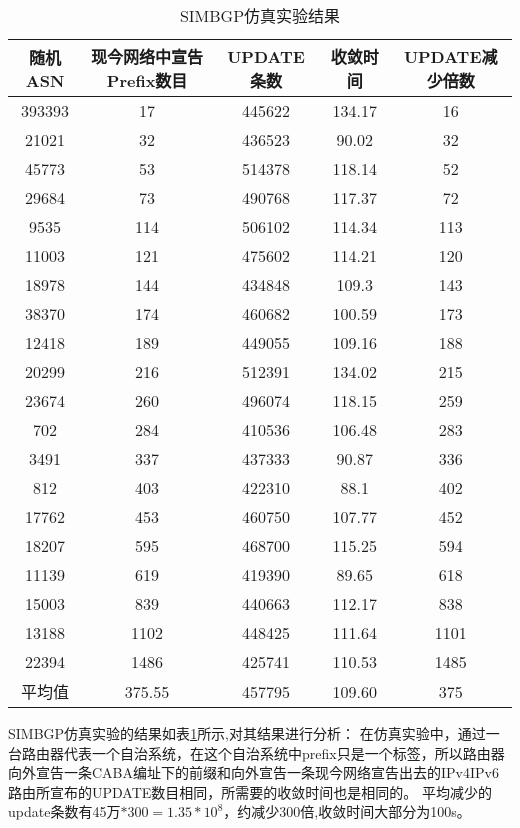 \begin{table}[h]
  \centering
  \caption{SIMBGP仿真实验结果}
  \label{tab:simres}
  \begin{tabular}{|c|c|c|c|c|}
            \hline
            随机ASN & 现今网络中宣告Prefix数目 & UPDATE条数 & 收敛时间 & UPDATE减少倍数\\ \hline
            393393 & 17 & 445622 & 134.17 & 16 \\ \hline
            21021 & 32 & 436523 & 90.02 & 32 \\ \hline
            45773 & 53 & 514378 & 118.14 & 52 \\ \hline
            29684 & 73 & 490768 & 117.37 & 72 \\ \hline
            9535 & 114 & 506102 & 114.34 & 113 \\ \hline
            11003 & 121 & 475602 & 114.21 & 120 \\ \hline
            18978 & 144 & 434848 & 109.3 & 143 \\ \hline
            38370 & 174 & 460682 & 100.59 & 173 \\ \hline
            12418 & 189 & 449055 & 109.16 & 188 \\ \hline
            20299 & 216 & 512391 & 134.02 & 215 \\ \hline
            23674 & 260 & 496074 & 118.15 & 259 \\ \hline
            702 & 284 & 410536 & 106.48 & 283 \\ \hline
            3491 & 337 & 437333 & 90.87 & 336 \\ \hline
            812 & 403 & 422310 & 88.1 & 402 \\ \hline
            17762 & 453 & 460750 & 107.77 & 452 \\ \hline
            18207 & 595 & 468700 & 115.25 & 594 \\ \hline
            11139 & 619 & 419390 & 89.65 & 618 \\ \hline
            15003 & 839 & 440663 & 112.17 & 838 \\ \hline
            13188 & 1102 & 448425 & 111.64 & 1101 \\ \hline
            22394 & 1486 & 425741 & 110.53 & 1485 \\ \hline
            平均值 & 375.55 & 457795 & 109.60 & 375 \\ \hline
  \end{tabular}
\end{table}


SIMBGP仿真实验的结果如表\ref{tab:simres}所示,对其结果进行分析：
在仿真实验中，通过一台路由器代表一个自治系统，在这个自治系统中prefix只是一个标签，所以路由器向外宣告一条CABA编址下的前缀和向外宣告一条现今网络宣告出去的IPv4\/IPv6路由所宣布的UPDATE数目相同，所需要的收敛时间也是相同的。
平均减少的update条数有45万$*$300$=1.35*10^{8}$，约减少300倍,收敛时间大部分为100s。

